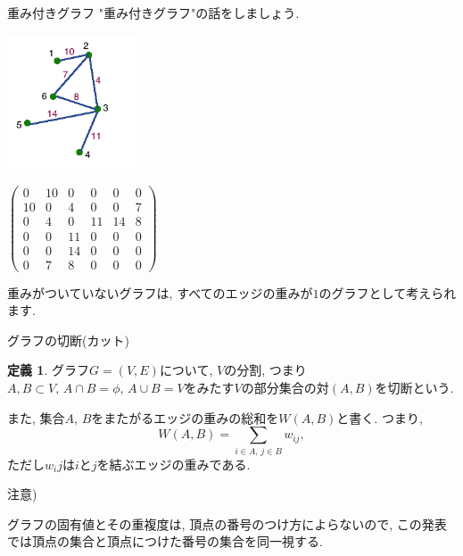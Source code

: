 \documentclass[dvipdfmx,11pt]{beamer}
\theoremstyle{definition}
\newtheorem{defn}{定義}
\begin{document}
\begin{frame}{重み付きグラフ}
"重み付きグラフ"の話をしましょう. \\ 

\begin{minipage}[c]{.45\textwidth}
 \begin{center}
  \includegraphics[width=40mm]{images/graph_to_matrix_weight.png}
 \end{center}
\end{minipage}
\begin{minipage}[c]{.45\textwidth} 
\begin{center}
$\begin{pmatrix}
 0 & 10 &  0 &  0 &  0 & 0 \\
10 &  0 &  4 &  0 &  0 & 7 \\
 0 &  4 &  0 & 11 & 14 & 8 \\
 0 &  0 & 11 &  0 &  0 & 0 \\
 0 &  0 & 14 &  0 &  0 & 0 \\
 0 &  7 &  8 &  0 &  0 & 0 
\end{pmatrix}$
\end{center} 
\end{minipage}

重みがついていないグラフは, すべてのエッジの重みが$1$のグラフとして考えられます.

\end{frame}

\begin{frame}{グラフの切断(カット)}

\begin{defn}
グラフ$G=(V, E)$について, $V$の分割, つまり$A, B\subset V,\,A \cap B = \phi,\, A\cup B = V$をみたす$V$の部分集合の対$(A,B)$を切断という.

また, 集合$A,\,B$をまたがるエッジの重みの総和を$W(A, B)$と書く. つまり, $$W(A, B) = \displaystyle\sum _{i \in A, \,j \in B} w_{ij},$$
ただし$w_ij$は$i$と$j$を結ぶエッジの重みである. 
\end{defn}

注意)

グラフの固有値とその重複度は, 頂点の番号のつけ方によらないので, この発表では頂点の集合と頂点につけた番号の集合を同一視する.
\end{frame}
\end{document}
